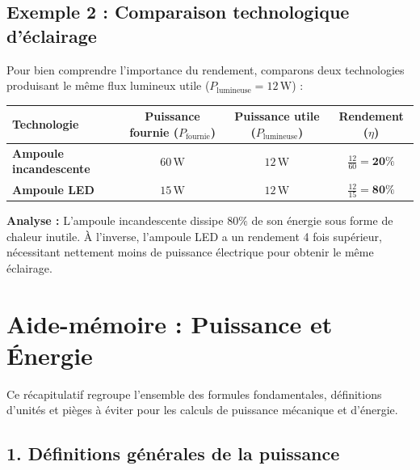 \documentclass[11pt,openany]{book}
\begin{document}
\subsection*{Exemple 2 : Comparaison technologique d'éclairage}

Pour bien comprendre l'importance du rendement, comparons deux technologies produisant le même flux lumineux utile ($P_{\mathrm{lumineuse}} = \mathrm{12\,W}$) :

\vspace{0.3cm}

\begin{center}
\renewcommand{\arraystretch}{1.4}
\begin{tabular}{|l|c|c|c|}
\hline
\textbf{Technologie} & \textbf{Puissance fournie ($P_{\mathrm{fournie}}$)} & \textbf{Puissance utile ($P_{\mathrm{lumineuse}}$)} & \textbf{Rendement ($\eta$)} \\ \hline
\textbf{Ampoule incandescente} & $\mathrm{60\,W}$ & $\mathrm{12\,W}$ & $\frac{12}{60} = \mathbf{20\%}$ \\ \hline
\textbf{Ampoule LED} & $\mathrm{15\,W}$ & $\mathrm{12\,W}$ & $\frac{12}{15} = \mathbf{80\%}$ \\ \hline
\end{tabular}
\end{center}

\vspace{0.3cm}

\noindent\textbf{Analyse :} L'ampoule incandescente dissipe $80\%$ de son énergie sous forme de chaleur inutile. À l'inverse, l'ampoule LED a un rendement 4 fois supérieur, nécessitant nettement moins de puissance électrique pour obtenir le même éclairage.

\section*{Aide-mémoire : Puissance et Énergie}

Ce récapitulatif regroupe l'ensemble des formules fondamentales, définitions d'unités et pièges à éviter pour les calculs de puissance mécanique et d'énergie.

\subsection*{1. Définitions générales de la puissance}
\end{document}
